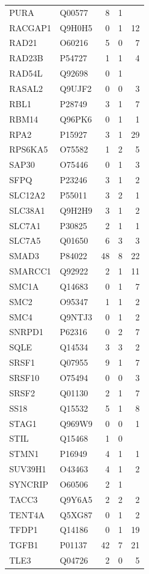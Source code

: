\begin{longtable}{llrrr}
PURA & Q00577 & 8 & 1 &  \\
RACGAP1 & Q9H0H5 & 0 & 1 & 12 \\
RAD21 & O60216 & 5 & 0 & 7 \\
RAD23B & P54727 & 1 & 1 & 4 \\
RAD54L & Q92698 & 0 & 1 &  \\
RASAL2 & Q9UJF2 & 0 & 0 & 3 \\
RBL1 & P28749 & 3 & 1 & 7 \\
RBM14 & Q96PK6 & 0 & 1 & 1 \\
RPA2 & P15927 & 3 & 1 & 29 \\
RPS6KA5 & O75582 & 1 & 2 & 5 \\
SAP30 & O75446 & 0 & 1 & 3 \\
SFPQ & P23246 & 3 & 1 & 2 \\
SLC12A2 & P55011 & 3 & 2 & 1 \\
SLC38A1 & Q9H2H9 & 3 & 1 & 2 \\
SLC7A1 & P30825 & 2 & 1 & 1 \\
SLC7A5 & Q01650 & 6 & 3 & 3 \\
SMAD3 & P84022 & 48 & 8 & 22 \\
SMARCC1 & Q92922 & 2 & 1 & 11 \\
SMC1A & Q14683 & 0 & 1 & 7 \\
SMC2 & O95347 & 1 & 1 & 2 \\
SMC4 & Q9NTJ3 & 0 & 1 & 2 \\
SNRPD1 & P62316 & 0 & 2 & 7 \\
SQLE & Q14534 & 3 & 3 & 2 \\
SRSF1 & Q07955 & 9 & 1 & 7 \\
SRSF10 & O75494 & 0 & 0 & 3 \\
SRSF2 & Q01130 & 2 & 1 & 7 \\
SS18 & Q15532 & 5 & 1 & 8 \\
STAG1 & Q969W9 & 0 & 0 & 1 \\
STIL & Q15468 & 1 & 0 &  \\
STMN1 & P16949 & 4 & 1 & 1 \\
SUV39H1 & O43463 & 4 & 1 & 2 \\
SYNCRIP & O60506 & 2 & 1 &  \\
TACC3 & Q9Y6A5 & 2 & 2 & 2 \\
TENT4A & Q5XG87 & 0 & 1 & 2 \\
TFDP1 & Q14186 & 0 & 1 & 19 \\
TGFB1 & P01137 & 42 & 7 & 21 \\
TLE3 & Q04726 & 2 & 0 & 5 \\

\end{longtable}
